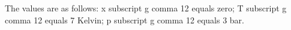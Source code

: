The values are as follows: x subscript g comma 12 equals zero; T subscript g comma 12 equals 7 Kelvin; p subscript g comma 12 equals 3 bar.